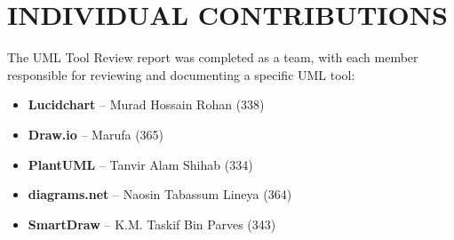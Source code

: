 \chapter{INDIVIDUAL CONTRIBUTIONS} \label{ch:data}
The UML Tool Review report was completed as a team, with each member responsible for reviewing and documenting a specific UML tool:

\begin{itemize}
    \item \textbf{Lucidchart} – Murad Hossain Rohan (338)
    \item \textbf{Draw.io} – Marufa (365)
    \item \textbf{PlantUML} – Tanvir Alam Shihab (334)
    \item \textbf{diagrams.net} – Naosin Tabassum Lineya (364)
    \item \textbf{SmartDraw} – K.M. Taskif Bin Parves (343)
\end{itemize}


